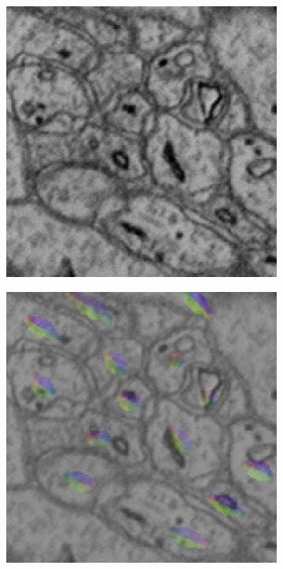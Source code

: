 \begin{figure}[t]
	\newcommand{\mywidth}{0.24\textwidth}
	\centering
	\begin{subfigure}[b]{\mywidth}
		\centering
		\includegraphics[width=\textwidth]{data/images/fieldLearning/fi_image.png}
		\caption{\label{fig:fi_im}}
	\end{subfigure}
	\begin{subfigure}[b]{\mywidth}
		\centering
		\includegraphics[width=\textwidth]{data/images/fieldLearning/fi_im_field.png}

\end{subfigure}
\end{figure}
